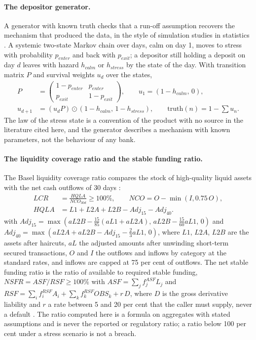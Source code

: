 \paragraph{The depositor generator.}
A generator with known truth checks that a run-off assumption recovers the mechanism that produced the data, in the style of simulation studies in statistics \citep{alm:morris2019}. A systemic two-state Markov chain over days, calm on day 1, moves to stress with probability $p_{enter}$ and back with $p_{exit}$; a depositor still holding a deposit on day $d$ leaves with hazard $h_{calm}$ or $h_{stress}$ by the state of the day. With transition matrix $P$ and survival weights $u_d$ over the states,
\begin{align}
P&=\begin{pmatrix}1-p_{enter}&p_{enter}\\ p_{exit}&1-p_{exit}\end{pmatrix},\qquad u_1=(1-h_{calm},\,0),\label{eq:alm-generator}\\
u_{d+1}&=(u_dP)\odot(1-h_{calm},\,1-h_{stress}),\qquad \text{truth}(n)=1-\textstyle\sum u_n.\label{eq:alm-truth}
\end{align}
The law of the stress state is a convention of the product with no source in the literature cited here, and the generator describes a mechanism with known parameters, not the behaviour of any bank.

\paragraph{The liquidity coverage ratio and the stable funding ratio.}
The Basel liquidity coverage ratio compares the stock of high-quality liquid assets with the net cash outflows of 30 days \citep{alm:lcr}:
\begin{align}
LCR&=\frac{HQLA}{NCO_{30d}}\ge 100\%,\qquad NCO=O-\min(I,0.75\,O),\label{eq:alm-lcr}\\
HQLA&=L1+L2A+L2B-Adj_{15}-Adj_{40}.\label{eq:alm-hqla}
\end{align}
with $Adj_{15}=\max(aL2B-\tfrac{15}{85}(aL1+aL2A),\,aL2B-\tfrac{15}{60}aL1,\,0)$ and $Adj_{40}=\max(aL2A+aL2B-Adj_{15}-\tfrac{2}{3}aL1,\,0)$, where $L1$, $L2A$, $L2B$ are the assets after haircuts, $aL$ the adjusted amounts after unwinding short-term secured transactions, $O$ and $I$ the outflows and inflows by category at the standard rates, and inflows are capped at 75 per cent of outflows. The net stable funding ratio is the ratio of available to required stable funding, $NSFR=ASF/RSF\ge 100\%$ with $ASF=\sum_j f^{ASF}_jL_j$ and $RSF=\sum_i f^{RSF}_iA_i+\sum_k f^{RSF}_kOBS_k+r\,D$, where $D$ is the gross derivative liability and $r$ a rate between 5 and 20 per cent that the caller must supply, never a default \citep{alm:nsf}. The ratio computed here is a formula on aggregates with stated assumptions and is never the reported or regulatory ratio; a ratio below 100 per cent under a stress scenario is not a breach.

